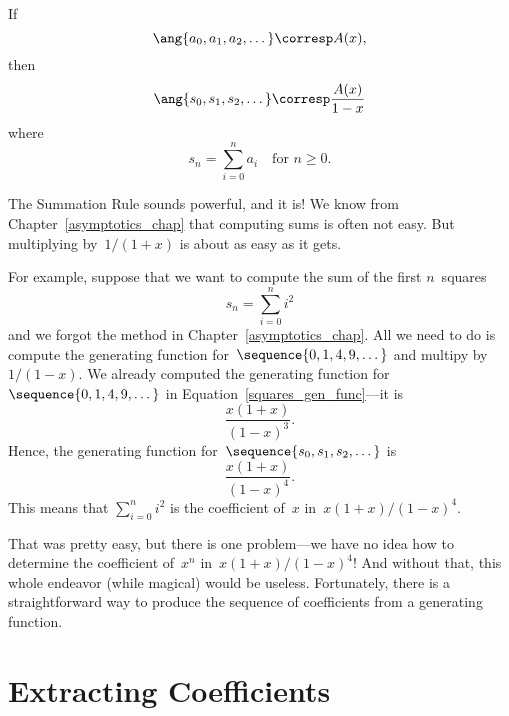 \begin{rul}
If
\begin{equation*}
    \ang{a_0, a_1, a_2, \dots} \corresp A(x),
\end{equation*}
then
\begin{equation*}
    \ang{s_0, s_1, s_2, \dots} \corresp \frac{A(x)}{1 - x}
\end{equation*}
where
\begin{equation*}
    s_n = \sum_{i = 0}^n a_i\quad\text{for $n \ge 0$}.
\end{equation*}
\end{rul}

  The Summation
Rule sounds powerful, and it is!  We know from
Chapter~\ref{asymptotics_chap} that computing sums is often not easy.
But multiplying  by~$1/(1 + x)$ is about as
easy as it gets.

For example, suppose that we want to compute the sum of the first
$n$~squares
\begin{equation*}
    s_n = \sum_{i = 0}^n i^2
\end{equation*}
and we forgot the method in Chapter~\ref{asymptotics_chap}.  All we
need to do is compute the generating function for~$\sequence{0, 1, 4,
  9, \dots}$ and multipy by~$1/(1 - x)$.  We already computed the
generating function for ~$\sequence{0, 1, 4, 9, \dots}$ in
Equation~\ref{squares_gen_func}---it is
\begin{equation*}
    \frac{x (1 + x)}{(1 - x)^3}.
\end{equation*}
Hence, the generating function for~$\sequence{s_0, s_1, s_2, \dots}$
is
\begin{equation*}
    \frac{x (1 + x)}{(1 - x)^4}.
\end{equation*}
This means that $\sum_{i = 0}^n i^2$ is the coefficient of~$x$ in~$x
(1 + x)/(1 - x)^4$.

That was pretty easy, but there is one problem---we have no idea how
to determine the coefficient of~$x^n$ in~$x(1 + x)/(1 - x)^4$!  And
without that, this whole endeavor (while magical) would be useless.
Fortunately, there is a straightforward way to produce the sequence of
coefficients from a generating function.

\section{Extracting Coefficients}

